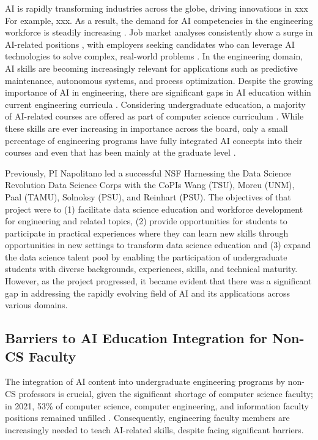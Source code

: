 \documentclass[11pt]{article}
\begin{document}
AI is rapidly transforming industries across the globe, driving innovations in xxx
For example, xxx.
As a result, the demand for AI competencies in the engineering workforce is steadily increasing \cite{li2022reskilling}. 
Job market analyses consistently show a surge in AI-related positions \cite{MaslejEtAl2023}, with employers seeking candidates who can leverage AI technologies to solve complex, real-world problems \cite{ApolloTechnicalLLC2024}. In the engineering domain, AI skills are becoming increasingly relevant \cite{samavedham2012facilitating, wanyan2019infusing} for applications such as predictive maintenance, autonomous systems, and process optimization.
Despite the growing importance of AI in engineering, there are significant gaps in AI education within current engineering curricula \cite{ramirez2018engineering}. 
Considering undergraduate education, a majority of AI-related courses are offered as part of computer science curriculum \cite{MaslejEtAl2023}.
While these skills are ever increasing in importance across the board, only a small percentage of engineering programs have fully integrated AI concepts into their courses and even that has been mainly at the graduate level \cite{wanyan2017integration, janssen2020multidisciplinary, mishra2020interdisciplinary}.

Previously, PI Napolitano led a successful NSF Harnessing the Data Science Revolution Data Science Corps with the CoPIs Wang (TSU), Moreu (UNM), Paal (TAMU), Solnoksy (PSU), and Reinhart (PSU). The objectives of that project were to (1) facilitate data science education and workforce development for engineering and related topics, (2) provide opportunities for students to participate in practical experiences where they can learn new skills through opportunities in new settings to transform data science education and (3) expand the data science talent pool by enabling the participation of undergraduate students with diverse backgrounds, experiences, skills, and technical maturity. However, as the project progressed, it became evident that there was a significant gap in addressing the rapidly evolving field of AI and its applications across various domains.

\subsection{Barriers to AI Education Integration for Non-CS Faculty}

The integration of AI content into undergraduate engineering programs by non-CS professors is crucial, given the significant shortage of computer science faculty; in 2021, 53\% of computer science, computer engineering, and information faculty positions remained unfilled \cite{MaslejEtAl2023}. Consequently, engineering faculty members are increasingly needed to teach AI-related skills, despite facing significant barriers.
\end{document}
